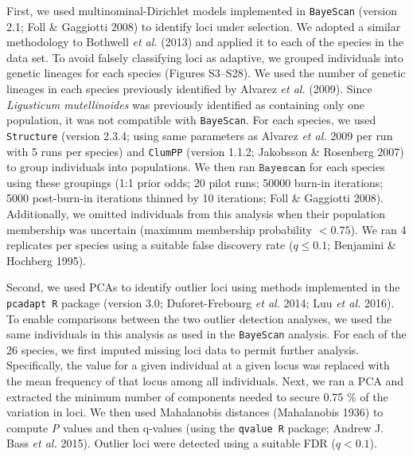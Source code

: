 \documentclass[11pt,]{article}
\begin{document}
First, we used multinominal-Dirichlet models implemented in
\texttt{BayeScan} (version 2.1; Foll \& Gaggiotti 2008) to identify loci
under selection. We adopted a similar methodology to Bothwell \emph{et
al.} (2013) and applied it to each of the species in the data set. To
avoid falsely classifying loci as adaptive, we grouped individuals into
genetic lineages for each species (Figures S3--S28). We used the number
of genetic lineages in each species previously identified by Alvarez
\emph{et al.} (2009). Since \textit{Ligusticum mutellinoides} was
previously identified as containing only one population, it was not
compatible with \texttt{BayeScan}. For each species, we used
\texttt{Structure} (version 2.3.4; using same parameters as Alvarez
\emph{et al.} 2009 per run with 5 runs per species) and \texttt{ClumPP}
(version 1.1.2; Jakobsson \& Rosenberg 2007) to group individuals into
populations. We then ran \(\texttt{Bayescan}\) for each species using
these groupings (1:1 prior odds; 20 pilot runs; 50000 burn-in
iterations; 5000 post-burn-in iterations thinned by 10 iterations; Foll
\& Gaggiotti 2008). Additionally, we omitted individuals from this
analysis when their population membership was uncertain (maximum
membership probability \(< 0.75\)). We ran 4 replicates per species
using a suitable false discovery rate (\(q \leq 0.1\); Benjamini \&
Hochberg 1995).

Second, we used PCAs to identify outlier loci using methods implemented
in the \texttt{pcadapt R} package (version 3.0; Duforet-Frebourg
\emph{et al.} 2014; Luu \emph{et al.} 2016). To enable comparisons
between the two outlier detection analyses, we used the same individuals
in this analysis as used in the \texttt{BayeScan} analysis. For each of
the 26 species, we first imputed missing loci data to permit further
analysis. Specifically, the value for a given individual at a given
locus was replaced with the mean frequency of that locus among all
individuals. Next, we ran a PCA and extracted the minimum number of
components needed to secure 0.75 \% of the variation in loci. We then
used Mahalanobis distances (Mahalanobis 1936) to compute \emph{P} values
and then q-values (using the \texttt{qvalue R} package; Andrew J. Bass
\emph{et al.} 2015). Outlier loci were detected using a suitable FDR
(\(q < 0.1\)).
\end{document}
